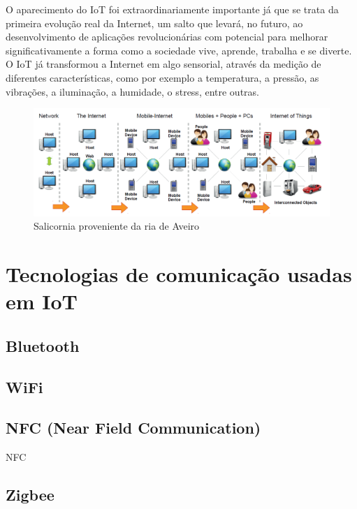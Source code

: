 O aparecimento do IoT foi extraordinariamente importante já que se trata da primeira evolução real da Internet, um salto que levará, no futuro, ao desenvolvimento de aplicações revolucionárias com potencial para melhorar significativamente a forma como a sociedade vive, aprende, trabalha e se diverte. O IoT já transformou a Internet em algo sensorial, através da medição de diferentes características, como por exemplo a temperatura, a pressão, as vibrações, a iluminação, a humidade, o stress, entre outras. 


\begin{figure}[!htb]
	\centering
	\includegraphics[scale=0.5]{img/cap3-iot/diagrama-evolution.png}
	\caption{Salicornia proveniente da ria de Aveiro}
	\label{Rotulo}
\end{figure}




\section{Tecnologias de comunicação usadas em \ac{IoT}}


\subsection{Bluetooth}

\subsection{WiFi}


\subsection{NFC (Near Field Communication)}

\ac{NFC}


\subsection{Zigbee}



